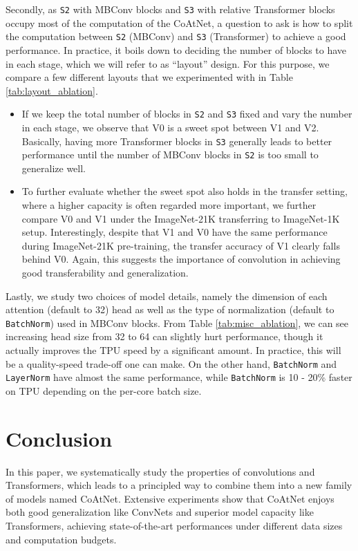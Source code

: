 \documentclass{article}
\newcommand{\name}{CoAtNet\xspace}
\begin{document}
Secondly, as \texttt{S2} with MBConv blocks and \texttt{S3} with relative Transformer blocks occupy most of the computation of the \name, a question to ask is how to split the computation between \texttt{S2} (MBConv) and \texttt{S3} (Transformer) to achieve a good performance.
In practice, it boils down to deciding the number of blocks to have in each stage, which we will refer to as ``layout'' design.
For this purpose, we compare a few different layouts that we experimented with in Table \ref{tab:layout_ablation}.
\begin{itemize}[leftmargin=*,topsep=0em,itemsep=0em,partopsep=0pt]
\item If we keep the total number of blocks in \texttt{S2} and \texttt{S3} fixed and vary the number in each stage, we observe that V0 is a sweet spot between V1 and V2.
Basically, having more Transformer blocks in \texttt{S3} generally leads to better performance until the number of MBConv blocks in \texttt{S2} is too small to generalize well.

\item To further evaluate whether the sweet spot also holds in the transfer setting, where a higher capacity is often regarded more important, we further compare V0 and V1 under the ImageNet-21K transferring to ImageNet-1K setup.
Interestingly, despite that V1 and V0 have the same performance during ImageNet-21K pre-training, the transfer accuracy of V1 clearly falls behind V0.
Again, this suggests the importance of convolution in achieving good transferability and generalization.
\end{itemize}

Lastly, we study two choices of model details, namely the dimension of each attention (default to 32) head as well as the type of normalization (default to \texttt{BatchNorm}) used in MBConv blocks.
From Table \ref{tab:misc_ablation}, we can see increasing head size from 32 to 64 can slightly hurt performance, though it actually improves the TPU speed by a significant amount.
In practice, this will be a quality-speed trade-off one can make.
On the other hand, \texttt{BatchNorm} and \texttt{LayerNorm} have almost the same performance, while \texttt{BatchNorm} is 10 - 20\% faster on TPU depending on the per-core batch size.


\section{Conclusion}
\label{sec:conclusion}
In this paper, we systematically study the properties of convolutions and Transformers, which leads to a principled way to combine them into a new family of models named \name. Extensive experiments show that \name enjoys both good generalization like ConvNets and superior model capacity like Transformers, achieving state-of-the-art performances under different data sizes and computation budgets.
\end{document}
